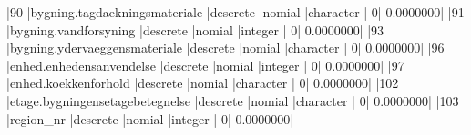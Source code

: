 \documentclass{report}
\begin{document}
\begin{Schunk}
\begin{Soutput}
|90  |bygning.tagdaekningsmateriale                                 |descrete           |nomial         |character       |              0|          0.0000000|
|91  |bygning.vandforsyning                                         |descrete           |nomial         |integer         |              0|          0.0000000|
|93  |bygning.ydervaeggensmateriale                                 |descrete           |nomial         |character       |              0|          0.0000000|
|96  |enhed.enhedensanvendelse                                      |descrete           |nomial         |integer         |              0|          0.0000000|
|97  |enhed.koekkenforhold                                          |descrete           |nomial         |character       |              0|          0.0000000|
|102 |etage.bygningensetagebetegnelse                               |descrete           |nomial         |character       |              0|          0.0000000|
|103 |region_nr                                                     |descrete           |nomial         |integer         |              0|          0.0000000|
\end{Soutput}
\end{Schunk}
\end{document}
